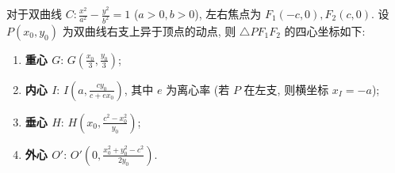 \begin{statementbox}
对于双曲线 $C: \frac{x^2}{a^2} - \frac{y^2}{b^2} = 1$ ($a>0, b>0$), 左右焦点为 $F_1(-c, 0), F_2(c, 0)$.
设 $P(x_0, y_0)$ 为双曲线右支上异于顶点的动点, 则 $\triangle PF_1F_2$ 的四心坐标如下:
\begin{enumerate}
    \item \textbf{重心 $G$}: $G\left( \frac{x_0}{3}, \frac{y_0}{3} \right)$;
    \item \textbf{内心 $I$}: $I\left( a, \frac{cy_0}{c+ex_0} \right)$, 其中 $e$ 为离心率 (若 $P$ 在左支, 则横坐标 $x_I = -a$);
    \item \textbf{垂心 $H$}: $H\left( x_0, \frac{c^2-x_0^2}{y_0} \right)$;
    \item \textbf{外心 $O'$}: $O'\left( 0, \frac{x_0^2+y_0^2-c^2}{2y_0} \right)$.
\end{enumerate}
\end{statementbox}